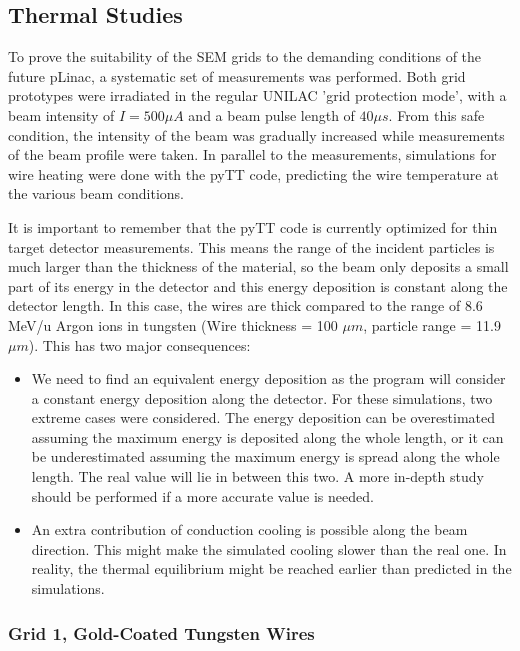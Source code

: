 \subsection{Thermal Studies}

To prove the suitability of the SEM grids to the demanding conditions of the future pLinac, a systematic set of measurements was performed. Both grid prototypes were irradiated in the regular UNILAC 'grid protection mode', with a beam intensity of $I = 500 \mu A $ and a beam pulse length of $40 \mu s$. From this safe condition, the intensity of the beam was gradually increased while measurements of the beam profile were taken. In parallel to the measurements, simulations for wire heating were done with the pyTT code, predicting the wire temperature at the various beam conditions. 

It is important to remember that the pyTT code is currently optimized for thin target detector measurements. This means the range of the incident particles is much larger than the thickness of the material, so the beam only deposits a small part of its energy in the detector and this energy deposition is constant along the detector length. In this case, the wires are thick compared to the range of 8.6 MeV/u Argon ions in tungsten (Wire thickness = 100 $\mu m$, particle range = 11.9 $\mu m$). This has two major consequences: 

\begin{itemize}
    \item We need to find an equivalent energy deposition as the program will consider a constant energy deposition along the detector. For these simulations, two extreme cases were considered. The energy deposition can be overestimated assuming the maximum energy is deposited along the whole length, or it can be underestimated assuming the maximum energy is spread along the whole length. The real value will lie in between this two. A more in-depth study should be performed if a more accurate value is needed. 
    \item An extra contribution of conduction cooling is possible along the beam direction. This might make the simulated cooling slower than the real one. In reality, the thermal equilibrium might be reached earlier than predicted in the simulations. 
\end{itemize}

\subsubsection{Grid 1, Gold-Coated Tungsten Wires}

